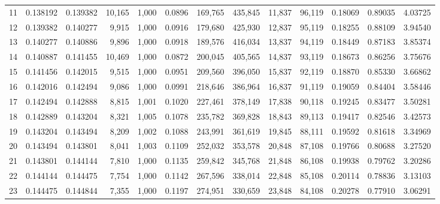 \begin{tabular}{rrrrrrrrrrrrr}
11  &  0.138192 &  0.139382 &  10,165 &  1,000 &                                     0.0896 &  169,765 &  435,845 &   11,837 &   96,119 &  0.18069 &  0.89035 &  4.03725 \\
12  &  0.139382 &  0.140277 &   9,915 &  1,000 &                                     0.0916 &  179,680 &  425,930 &   12,837 &   95,119 &  0.18255 &  0.88109 &  3.94540 \\
13  &  0.140277 &  0.140886 &   9,896 &  1,000 &                                     0.0918 &  189,576 &  416,034 &   13,837 &   94,119 &  0.18449 &  0.87183 &  3.85374 \\
14  &  0.140887 &  0.141455 &  10,469 &  1,000 &                                     0.0872 &  200,045 &  405,565 &   14,837 &   93,119 &  0.18673 &  0.86256 &  3.75676 \\
15  &  0.141456 &  0.142015 &   9,515 &  1,000 &                                     0.0951 &  209,560 &  396,050 &   15,837 &   92,119 &  0.18870 &  0.85330 &  3.66862 \\
16  &  0.142016 &  0.142494 &   9,086 &  1,000 &                                     0.0991 &  218,646 &  386,964 &   16,837 &   91,119 &  0.19059 &  0.84404 &  3.58446 \\
17  &  0.142494 &  0.142888 &   8,815 &  1,001 &                                     0.1020 &  227,461 &  378,149 &   17,838 &   90,118 &  0.19245 &  0.83477 &  3.50281 \\
18  &  0.142889 &  0.143204 &   8,321 &  1,005 &                                     0.1078 &  235,782 &  369,828 &   18,843 &   89,113 &  0.19417 &  0.82546 &  3.42573 \\
19  &  0.143204 &  0.143494 &   8,209 &  1,002 &                                     0.1088 &  243,991 &  361,619 &   19,845 &   88,111 &  0.19592 &  0.81618 &  3.34969 \\
20  &  0.143494 &  0.143801 &   8,041 &  1,003 &                                     0.1109 &  252,032 &  353,578 &   20,848 &   87,108 &  0.19766 &  0.80688 &  3.27520 \\
21  &  0.143801 &  0.144144 &   7,810 &  1,000 &                                     0.1135 &  259,842 &  345,768 &   21,848 &   86,108 &  0.19938 &  0.79762 &  3.20286 \\
22  &  0.144144 &  0.144475 &   7,754 &  1,000 &                                     0.1142 &  267,596 &  338,014 &   22,848 &   85,108 &  0.20114 &  0.78836 &  3.13103 \\
23  &  0.144475 &  0.144844 &   7,355 &  1,000 &                                     0.1197 &  274,951 &  330,659 &   23,848 &   84,108 &  0.20278 &  0.77910 &  3.06291 \\

\end{tabular}
